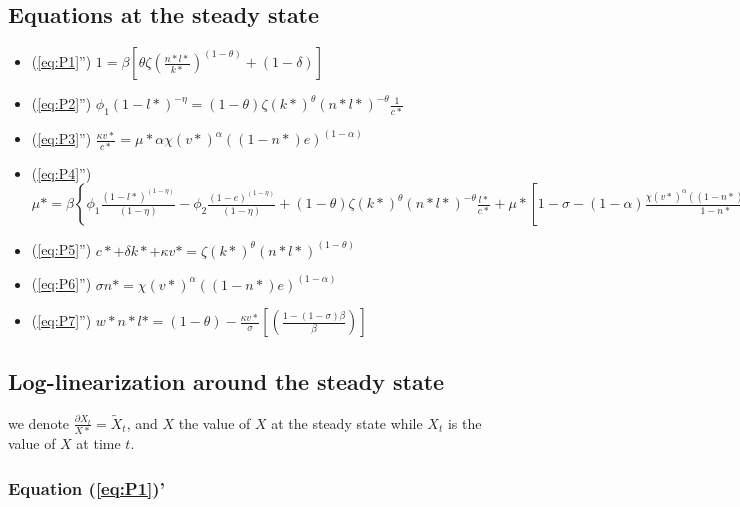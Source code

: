 \documentclass[english]{article}
\begin{document}
\subsection{Equations at the steady state}
\begin{itemize}
\item (\ref{eq:P1}'') $1=\beta\left[\theta\zeta(\frac{n*l*}{k*})^{(1-\theta)}+(1-\delta)\right]$
\item (\ref{eq:P2}'') $\phi_{1}\left(1-l*\right)^{-\eta}=(1-\theta)\zeta(k*)^{\theta}(n*l*)^{-\theta}\frac{1}{c*}$
\item (\ref{eq:P3}'') $\frac{\kappa v*}{c*}=\mu*\alpha\chi(v*)^{\alpha}((1-n*)e)^{(1-\alpha)}$
\item (\ref{eq:P4}'') $\mu*=\beta\left\{ \phi_{1}\frac{\left(1-l*\right)^{(1-\eta)}}{(1-\eta)}-\phi_{2}\frac{\left(1-e\right)^{(1-\eta)}}{(1-\eta)}+(1-\theta)\zeta(k*)^{\theta}(n*l*)^{-\theta}\frac{l*}{c*}+\mu*\left[1-\sigma-(1-\alpha)\frac{\chi(v*)^{\alpha}((1-n*)e)^{(1-\alpha)}}{1-n*}\right]\right\} $
\item (\ref{eq:P5}'') $c*+\delta k*+\kappa v*=\zeta(k*)^{\theta}(n*l*)^{(1-\theta)}$
\item (\ref{eq:P6}'') $\sigma n*=\chi(v*)^{\alpha}((1-n*)e)^{(1-\alpha)}$
\item (\ref{eq:P7}'') $w*n*l*=(1-\theta)-\frac{\kappa v*}{\sigma}\left[\left(\frac{1-\left(1-\sigma\right)\beta}{\beta}\right)\right]$
\end{itemize}

\subsection{Log-linearization around the steady state}

we denote $\frac{\partial X_{t}}{X*}=\widetilde{X}_{t}$, and $X$ the value of $X$ at the steady state while $X_{t}$ is the value of $X$ at time $t$. \\

\subsubsection{Equation (\ref{eq:P1})'}
\end{document}
